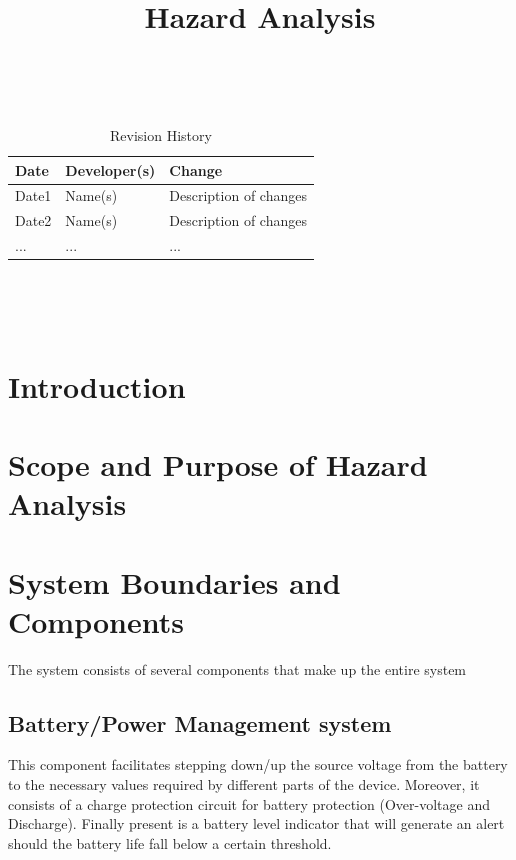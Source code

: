 \documentclass{article}
\title{Hazard Analysis\\\progname}
\author{\authname}
\date{}
\begin{document}
\maketitle
\thispagestyle{empty}

~\newpage


\begin{table}[hp]
	\caption{Revision History} \label{TblRevisionHistory}
	\begin{tabularx}{\textwidth}{llX}
		\toprule
		\textbf{Date} & \textbf{Developer(s)} & \textbf{Change}        \\
		\midrule
		Date1         & Name(s)               & Description of changes \\
		Date2         & Name(s)               & Description of changes \\
		...           & ...                   & ...                    \\
		\bottomrule
	\end{tabularx}
\end{table}

~\newpage

\tableofcontents

~\newpage



\section{Introduction}


\section{Scope and Purpose of Hazard Analysis}

\section{System Boundaries and Components}
The system consists of several components that make up the entire system

\subsection{Battery/Power Management system}
This component facilitates stepping down/up the source voltage from the battery to the necessary values required by different parts of the device. Moreover, it consists of a 										charge protection circuit for battery protection (Over-voltage and Discharge). Finally present is a battery level indicator that will generate an alert should the battery life fall below a certain threshold.
\end{document}

